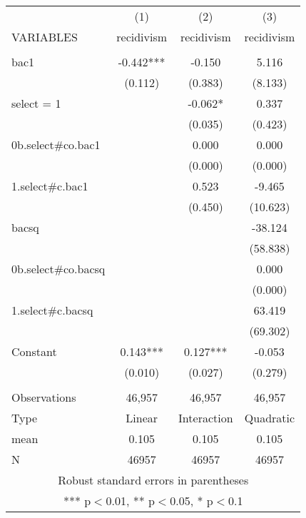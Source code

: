 \begin{tabular}{lccc} \hline
 & (1) & (2) & (3) \\
VARIABLES & recidivism & recidivism & recidivism \\ \hline
 &  &  &  \\
bac1 & -0.442*** & -0.150 & 5.116 \\
 & (0.112) & (0.383) & (8.133) \\
select = 1 &  & -0.062* & 0.337 \\
 &  & (0.035) & (0.423) \\
0b.select\#co.bac1 &  & 0.000 & 0.000 \\
 &  & (0.000) & (0.000) \\
1.select\#c.bac1 &  & 0.523 & -9.465 \\
 &  & (0.450) & (10.623) \\
bacsq &  &  & -38.124 \\
 &  &  & (58.838) \\
0b.select\#co.bacsq &  &  & 0.000 \\
 &  &  & (0.000) \\
1.select\#c.bacsq &  &  & 63.419 \\
 &  &  & (69.302) \\
Constant & 0.143*** & 0.127*** & -0.053 \\
 & (0.010) & (0.027) & (0.279) \\
 &  &  &  \\
Observations & 46,957 & 46,957 & 46,957 \\
Type & Linear & Interaction & Quadratic \\
mean & 0.105 & 0.105 & 0.105 \\
 N & 46957 & 46957 & 46957 \\ \hline
\multicolumn{4}{c}{ Robust standard errors in parentheses} \\
\multicolumn{4}{c}{ *** p$<$0.01, ** p$<$0.05, * p$<$0.1} \\
\end{tabular}
